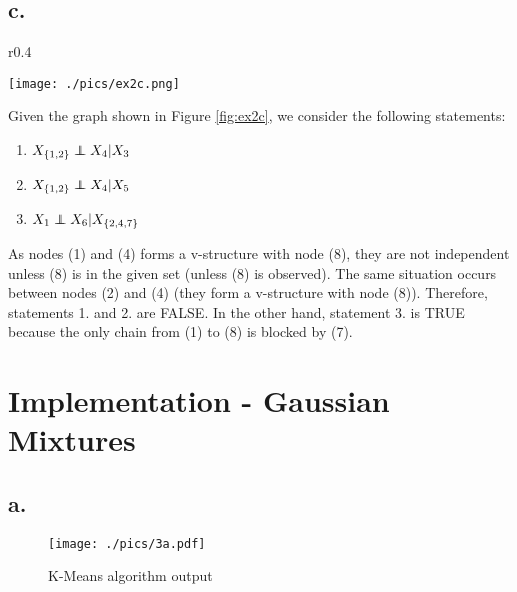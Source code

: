 \documentclass[12pt]{article}
\newcommand\independent{\protect\mathpalette{\protect\independenT}{\perp}}
\def\independenT#1#2{\mathrel{\rlap{$#1#2$}\mkern2mu{#1#2}}}
\begin{document}
\subsection*{c.}
\begin{wrapfigure}{r}{0.4\textwidth}
	\vspace{-20pt}
	\begin{center}
		\texttt{[image: ./pics/ex2c.png]}
	\end{center}
	\vspace{-20pt}
	\caption{Graph $G$}
	\label{fig:ex2c}
\end{wrapfigure}
Given the graph shown in Figure \ref{fig:ex2c}, we consider the following statements:
\begin{enumerate}
	\item $X_{\{1,2\}}\independent X_4|X_3$
	\item $X_{\{1,2\}}\independent X_4|X_5$
	\item $X_1\independent X_6|X_{\{2,4,7\}}$
\end{enumerate}
As nodes (1) and (4) forms a v-structure with node (8), they are not independent unless (8) is in the given set (unless (8) is observed). The same situation occurs between nodes (2) and (4) (they form a v-structure with node (8)). Therefore, statements 1. and 2. are FALSE. In the other hand, statement 3. is TRUE because the only chain from (1) to (8) is blocked by (7).

\section*{Implementation - Gaussian Mixtures}
\subsection*{a.}
\begin{figure}[h!]
	\centering 
	\texttt{[image: ./pics/3a.pdf]}
	\caption{K-Means algorithm output}
	\label{fig:3a}
\end{figure}
\end{document}
